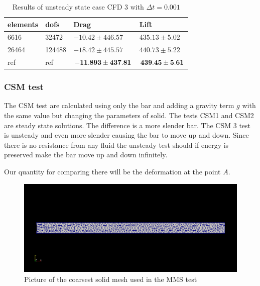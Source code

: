 \begin{table}[]
\centering
\caption{Results of unsteady state case CFD 3 with $\Delta t = 0.001$}
\label{my-label}
\begin{tabular}{|l|l|l|l|}
\hline
\textbf{elements} & \textbf{dofs} & \textbf{Drag} & \textbf{Lift} \\ \hline
6616 & 32472 & $ -10.42 \pm 446.57  $ & $ 435.13 \pm 5.02 $ \\ \hline
26464 & 124488 & $ -18.42 \pm 445.57 $ & $ 440.73 \pm 5.22 $ \\ \hline
ref & ref & $\bold{ -11.893 \pm 437.81 }$ & $\bold{ 439.45 \pm 5.61 }$ \\ \hline
\end{tabular}
\end{table}

\subsubsection{CSM test}
The CSM test are calculated using only the bar and adding a gravity term $g$ with the same value but changing the parameters of solid. The tests CSM1 and CSM2 are steady state solutions. The difference is a more slender bar. The CSM 3 test is unsteady and even more slender causing the bar to move up and down. Since there is no resistance from any fluid the unsteady test should if energy is preserved make the bar move up and down infinitely. 

Our quantity for comparing there will be the deformation at the point $A$. 
\begin{center}
\begin{figure}[H]
\caption{Picture of the coarsest solid mesh used in the MMS test}
\includegraphics[scale=0.50,trim={18mm 55mm 18mm 55mm},clip]{./Verification_Validation/Hron_Turek/structure.png}
\end{figure}
\end{center}

\vspace{0cm}

